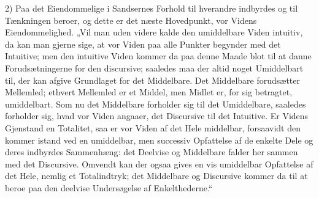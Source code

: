 \documentclass[12pt]{book}
\begin{document}
2) Paa det Eiendommelige i Sandsernes Forhold til hverandre indbyrdes og til Tænkningen beroer, og
dette er det næste Hovedpunkt, vor Videns Eiendommelighed. „Vil man uden videre kalde den
umiddelbare Viden intuitiv, da kan man gjerne sige, at vor Viden paa alle Punkter begynder med det
Intuitive; men den intuitive Viden kommer da paa denne Maade blot til at danne Forudsætningerne for
den discursive; saaledes maa der altid noget Umiddelbart til, der kan afgive Grundlaget for det
Middelbare. Det Middelbare forudsætter Mellemled; ethvert Mellemled er et Middel, men Midlet er, for
sig betragtet, umiddelbart. Som nu det Middelbare forholder sig til det Umiddelbare, saaledes
forholder sig, hvad vor Viden angaaer, det Discursive til det Intuitive. Er Videns Gjenstand en
Totalitet, saa er vor Viden af det Hele middelbar, forsaavidt den kommer istand ved en umiddelbar,
men successiv Opfattelse af de enkelte Dele og deres indbyrdes Sammenhæng: det Deelvise og
Middelbare falder her sammen med det Discursive. Omvendt kan der ogsaa gives en vis umiddelbar
Opfattelse af det Hele, nemlig et Totalindtryk; det Middelbare og Discursive kommer da til at beroe
paa den deelvise Undersøgelse af Enkelthederne.“
\end{document}
